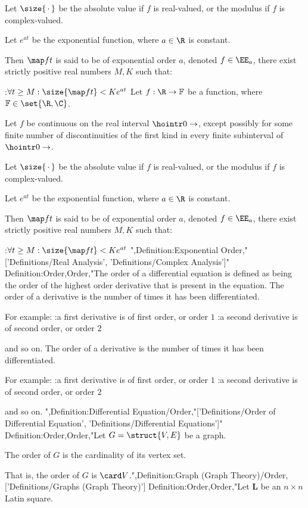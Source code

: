 Let  $\size {\, \cdot \,}$ be the absolute value if $f$ is real-valued, or the modulus if $f$ is complex-valued.

Let $e^{a t}$ be the exponential function, where $a \in \R$ is constant.


Then $\map f t$ is said to be of exponential order $a$, denoted $f \in \EE_a$,  there exist strictly positive real numbers $M, K$ such that:

:$\forall t \ge M: \size {\map f t} < K e^{a t}$
Let $f: \R \to \mathbb F$ be a function, where $\mathbb F \in \set {\R, \C}$.

Let $f$ be continuous on the real interval $\hointr 0 \to$, except possibly for some finite number of discontinuities of the first kind in every finite subinterval of $\hointr 0 \to$.



Let  $\size {\, \cdot \,}$ be the absolute value if $f$ is real-valued, or the modulus if $f$ is complex-valued.

Let $e^{a t}$ be the exponential function, where $a \in \R$ is constant.


Then $\map f t$ is said to be of exponential order $a$, denoted $f \in \EE_a$,  there exist strictly positive real numbers $M, K$ such that:

:$\forall t \ge M: \size {\map f t} < K e^{a t}$
",Definition:Exponential Order,"['Definitions/Real Analysis', 'Definitions/Complex Analysis']"
Definition:Order,Order,"The order of a differential equation is defined as being the order of the highest order derivative that is present in the equation.
The order of a derivative is the number of times it has been differentiated.

For example:
:a first derivative is of first order, or order $1$
:a second derivative is of second order, or order $2$

and so on.
The order of a derivative is the number of times it has been differentiated.

For example:
:a first derivative is of first order, or order $1$
:a second derivative is of second order, or order $2$

and so on.
",Definition:Differential Equation/Order,"['Definitions/Order of Differential Equation', 'Definitions/Differential Equations']"
Definition:Order,Order,"Let $G = \struct {V, E}$ be a graph.

The order of $G$ is the cardinality of its vertex set.


That is, the order of $G$ is $\card V$.",Definition:Graph (Graph Theory)/Order,['Definitions/Graphs (Graph Theory)']
Definition:Order,Order,"Let $\mathbf L$ be an $n \times n$ Latin square.

